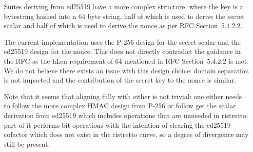 Suites deriving from ed25519 have a more complex structure, where the key is a bytestring hashed into a 64 byte string, half of which is used to derive the secret scalar and half of which is used to derive the nonce as per RFC Section~5.4.2.2.

The current implementation uses the P-256 design for the secret scalar and the ed25519 design for the nonce. This does not directly contradict the guidance in the RFC as the hLen requirement of 64 mentioned in RFC Section~5.4.2.2 is met. We do not believe there exists an issue with this design choice: domain separation is not impacted and the contribution of the secret key to the nonce is similar. 

Note that it seems that aligning fully with either is not trivial: one either needs to follow the more complex HMAC design from P-256 or follow get the scalar derivation from ed25519 which includes operations that are unneeded in ristretto: part of it performs bit operations  with the intention of clearing the ed25519 cofactor which does not exist in the ristretto curve, so a degree of divergence may still be present.

